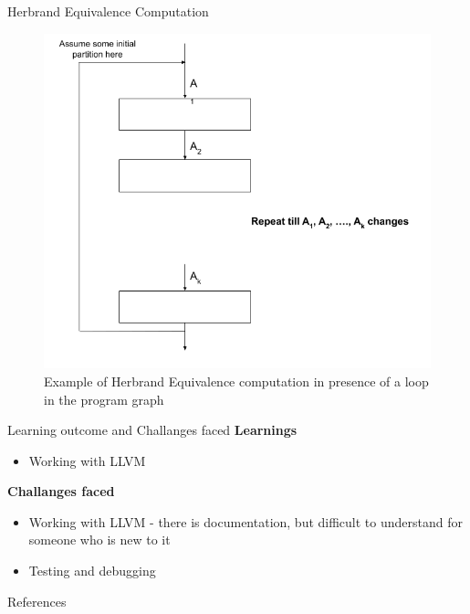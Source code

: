 \documentclass[11pt]{beamer}
\begin{document}
\begin{frame}{Herbrand Equivalence Computation}
    \begin{figure}[!h]
        \centering
        \includegraphics[scale=0.3]{HerbrandEquivalenceLoop.png}
        \caption{Example of Herbrand Equivalence computation in presence of a loop in the program graph}
        \label{fig:HerbrandEquivalenceLoop}
    \end{figure}
\end{frame}

\begin{frame}{Learning outcome and Challanges faced}
    \textbf{Learnings}
    \begin{itemize}
        \item Working with LLVM
    \end{itemize}
    \textbf{Challanges faced}
    \begin{itemize}
        \item Working with LLVM - there is documentation, but difficult to understand for someone who is new to it
        \item Testing and debugging
    \end{itemize}
\end{frame}

\begin{frame}{References}


\end{frame}
\end{document}

